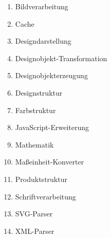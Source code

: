 \begin{enumerate}
\item Bildverarbeitung 
\item Cache 
\item Designdarstellung 
\item Designobjekt-Transformation 
\item Designobjekterzeugung 
\item Designstruktur 
\item Farbstruktur 
\item JavaScript-Erweiterung 
\item Mathematik  
\item Maßeinheit-Konverter 
\item Produktstruktur 
\item Schriftverarbeitung 
\item SVG-Parser 
\item XML-Parser 
\end{enumerate}